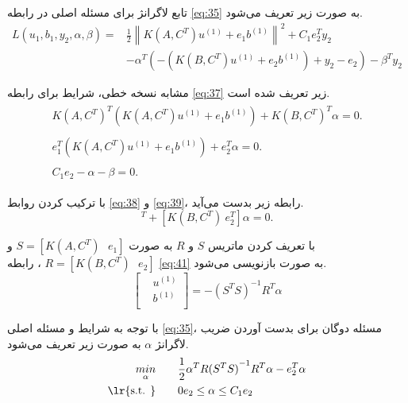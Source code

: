 تابع لاگرانژ برای مسئله اصلی در رابطه \ref{eq:35} به صورت زیر تعریف می‌شود.
\begin{equation}
\begin{split}
L(u_{1},b_{1},y_{2}, \alpha, \beta )= & \frac{1}{2}{{\left\| K(A, C^{T}){{u}^{(1)}}+{{e}_{1}}{{b}^{(1)}} \right\|}^{2}} + {{C}_{1}}e_{2}^{T}y_{2} \\
&-\alpha^{T}(-(K(B, C^{T})u^{(1)}+e_{2}b^{(1)})+y_{2} - e_{2}) - \beta^{T}y_{2}
\end{split}
\label{eq:37}
\end{equation}

مشابه نسخه خطی، شرایط  برای رابطه \ref{eq:37} زیر تعریف شده است.
\begin{align}
\label{eq:38}
\begin{split}
K(A, C^{T})^{T}(K(A,C^{T}){{u}^{(1)}}+{{e}_{1}}{{b}^{(1)}}) + K(B, C^{T})^{T}\alpha = 0.
\end{split} \\
\label{eq:39}
\begin{split}
e_{1}^{T}(K(A,C^{T}){{u}^{(1)}}+{{e}_{1}}{{b}^{(1)}}) + e_{2}^{T}\alpha = 0.
\end{split}\\
\label{eq:40}
\begin{split}
C_{1}e_{2} - \alpha - \beta = 0.
\end{split} 
\end{align}

با ترکیب کردن روابط \ref{eq:38} و \ref{eq:39}، رابطه زیر بدست می‌آید.
\begin{equation}
[K(A,C^{T})^{T}\ e^{T}_{1}][K(A,C^{T})\ e_{1}][u^{(1)}\ b^{(1)}]^{T} + [K(B, C^{T})\ e^{T}_{2}]\alpha = 0.
\label{eq:41}
\end{equation}

با تعریف کردن ماتریس $S$ و $R$  به صورت $S=[K(A,C^{T})\text{ }e_{1}]$ و $R=[K(B,C^{T})\text{ }e_{2}]$ ، رابطه \ref{eq:41} به صورت بازنویسی می‌شود.
\begin{equation}
\left[ \begin{aligned}
& {{u}^{(1)}} \\
& {{b}^{(1)}} \\
\end{aligned}\right]= -{{({{S}^{T}}S)}^{-1}}{{R}^{T}}\alpha
\label{eq:42}
\end{equation}

با توجه به شرایط  و مسئله اصلی \ref{eq:35}، مسئله دوگان برای بدست آوردن ضریب لاگرانژ $\alpha$ به صورت زیر تعریف می‌شود.
\begin{equation}
\begin{split}
\mathop{{ min}}\limits_{\alpha} \qquad & \frac{1}{2}{{\alpha }^{T}}R{{({{S}^{T}}S)}^{-1}}{{R}^{T}}\alpha -e_{2}^{T}\alpha  \\
\textrm{\lr{s.t. }} \qquad & 0{{e}_{2}}\le \alpha \le {{C}_{1}}{{e}_{2}}
\end{split}
\label{eq:43}
\end{equation}


